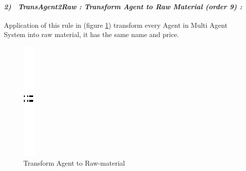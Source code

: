 \paragraph{\emph{2)~ TransAgent2Raw : Transform Agent to Raw Material (order 9) :} }
Application of this rule in (figure \ref{fig:Generate for each agent raw material}) transform every Agent in Multi
Agent System into raw material, it has the same name and price.
\vspace{1cm} 
\begin{figure}[th]
\centering
	\quad{}
		\includegraphics{ch3/img/sep}
	\quad{}
\caption{\label{fig:Generate for each agent raw material}Transform Agent to Raw-material} 
\end{figure}
\vspace{1cm}

